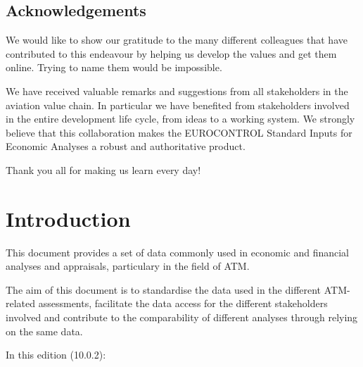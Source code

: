 \documentclass[
  11pt,
  a4paper,
]{book}
\begin{document}
\hypertarget{acknowledgements}{%
\section*{Acknowledgements}\label{acknowledgements}}


We would like to show our gratitude to the many different colleagues
that have contributed to this endeavour by helping us develop the values
and get them online. Trying to name them would be impossible.

We have received valuable remarks and suggestions from all stakeholders
in the aviation value chain. In particular we have benefited from
stakeholders involved in the entire development life cycle, from ideas
to a working system. We strongly believe that this collaboration makes
the EUROCONTROL Standard Inputs for Economic Analyses a robust and
authoritative product.

Thank you all for making us learn every day!


\hypertarget{introduction}{%
\chapter*{Introduction}\label{introduction}}


This document provides a set of data commonly used in economic and
financial analyses and appraisals, particulary in the field of ATM.

The aim of this document is to standardise the data used in the
different ATM-related assessments, facilitate the data access for the
different stakeholders involved and contribute to the comparability of
different analyses through relying on the same data.

In this edition (10.0.2):
\end{document}

